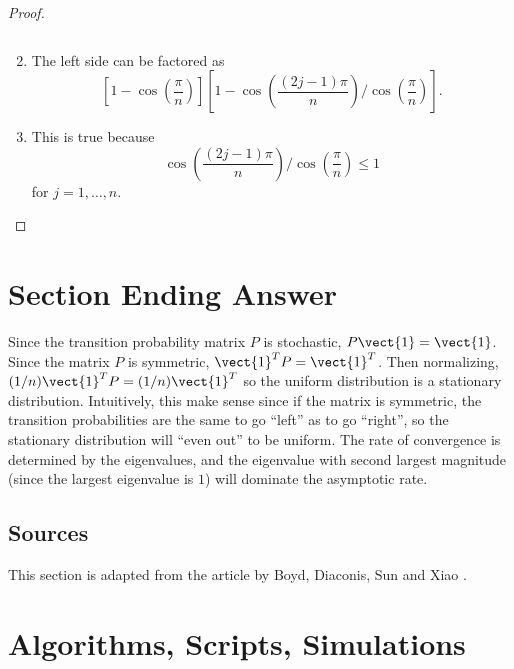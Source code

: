 \documentclass[12pt]{article}
\begin{document}
\begin{proof}
\begin{enumerate}
\[            \]
        \item
            The left side can be factored as
            \[
                \left[ 1 - \cos\left( \frac{\pi}{n} \right) \right]
                \left[ 1 - \cos\left( \frac{(2j-1)\pi}{n} \right) \bigg/
                \cos\left( \frac{\pi} {n} \right) \right].
            \]
        \item
            This is true because
            \[
                \cos\left(\frac{(2j-1)\pi}{n} \right) \bigg/ \cos\left(
                \frac{\pi} {n} \right) \le 1
            \] for \( j = 1, \dots, n \).
    \end{enumerate}
\end{proof}

\hr

\section*{Section Ending Answer}

Since the transition probability matrix \( P \) is stochastic, \( P
\vect{1} = \vect{1} \).  Since the matrix \( P \) is symmetric, \( \vect
{1}^{T} P = \vect{1}^{T} \).  Then normalizing, \( (1/n)\vect{1}^{T} P =
(1/n)\vect{1}^{T} \) so the uniform distribution is a stationary
distribution.  Intuitively, this make sense since if the matrix is
symmetric, the transition probabilities are the same to go ``left'' as
to go ``right'', so the stationary distribution will ``even out'' to be
uniform.  The rate of convergence is determined by the eigenvalues, and
the eigenvalue with second largest magnitude (since the largest
eigenvalue is \( 1 \)) will dominate the asymptotic rate.

\subsection*{Sources}

This section is adapted from the article by Boyd, Diaconis, Sun and
Xiao
\cite{doi:10.1080/00029890.2006.11920281}.

\hr

\section*{Algorithms, Scripts, Simulations}
\end{document}
